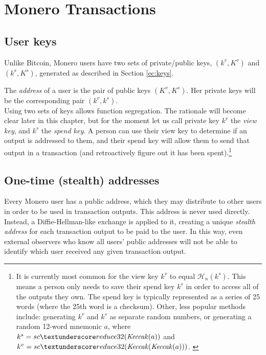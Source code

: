 \chapter{Monero Transactions}
\label{chapter:transactions}

\section{User keys}
\label{sec:user-keys}

Unlike Bitcoin, Monero users have two sets of private/public keys, \((k^v, K^v)\) and \( (k^s, K^s) \), generated as described in Section \ref{ec:keys}.

The {\em address} of a user is the pair of public keys \((K^v, K^s)\). Her private keys will be the corresponding pair \( (k^v, k^s) \).
\\

Using two sets of keys allows function segregation. The rationale will become clear later in this chapter, but for the moment let us call private key $k^v$ the {\em view key}, and $k^s$ the {\em spend key}. A person can use their view key to determine if an output is addressed to them, and their spend key will allow them to send that output in a transaction (and retroactively figure out it has been spent).\footnote{It is currently most common for the view key $k^v$ to equal $\mathcal{H}_n(k^s)$. This means a person only needs to save their spend key $k^s$ in order to access all of the outputs they own. The spend key is typically represented as a series of 25 words (where the 25th word is a checksum). Other, less popular methods include: generating $k^v$ and $k^s$ as separate random numbers, or generating a random 12-word mnemonic $a$, where $k^s = sc\textunderscore reduce32(\mathit{Keccak}(a))$ and $k^v = sc\textunderscore reduce32(\mathit{Keccak}(\mathit{Keccak}(a)))$. \cite{luigi-address}}



\section{One-time (stealth) addresses}
\label{sec:one-time-addresses}

Every Monero user has a public address, which they may distribute to other users in order to be used in transaction outputs. This address is never used directly. Instead, a Diffie-Hellman-like exchange is applied to it, creating a unique {\em stealth address} for each transaction output to be paid to the user. In this way, even external observers who know all users’ public addresses will not be able to identify which user received any given transaction output.
\\

